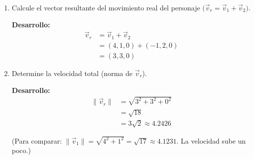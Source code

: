 \begin{enumerate}[label=\textbf{\arabic*.}, itemsep=0.8em, leftmargin=2em]
  \item Calcule el vector resultante del movimiento real del personaje $\big(\vec v_r = \vec v_1 + \vec v_2\big)$.
  \begin{center}
  \colorbox{blue!5}{\begin{minipage}{0.9\textwidth}
  \vspace{0.2cm}
  \textbf{Desarrollo:}
  \vspace{0.2cm}
  \begin{align*}
  \vec v_r &= \vec v_1 + \vec v_2 \\
       &= (4,1,0) + (-1,2,0) \\
       &= (3,3,0)
  \end{align*}
  \vspace{0.2cm}
  \end{minipage}}
  \end{center}
  
  \item Determine la velocidad total (norma de $\vec v_r$).
  \begin{center}
  \colorbox{green!5}{\begin{minipage}{0.9\textwidth}
  \vspace{0.2cm}
  \textbf{Desarrollo:}
  \vspace{0.2cm}
  \begin{align*}
  \|\vec v_r\| &= \sqrt{3^2 + 3^2 + 0^2} \\
         &= \sqrt{18} \\
         &= 3\sqrt{2} \approx 4.2426
  \end{align*}
  \vspace{0.2cm}
  \end{minipage}}
  \end{center}
  
  (Para comparar: $\|\vec v_1\| = \sqrt{4^2 + 1^2} = \sqrt{17} \approx 4.1231$. La velocidad sube un poco.)
  

\end{enumerate}
